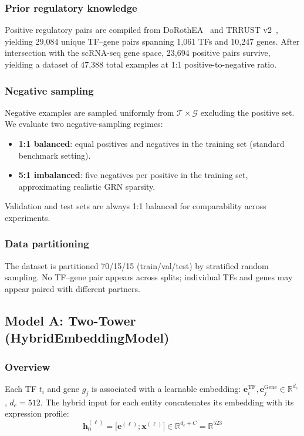 \documentclass[10pt,twocolumn]{article}
\begin{document}
\subsubsection{Prior regulatory knowledge}
Positive regulatory pairs are compiled from DoRothEA~\cite{garcia2019benchmark}
and TRRUST v2~\cite{han2018trrust}, yielding 29{,}084 unique TF--gene pairs
spanning 1{,}061 TFs and 10{,}247 genes.
After intersection with the scRNA-seq gene space, 23{,}694 positive pairs
survive, yielding a dataset of 47{,}388 total examples at 1:1 positive-to-negative ratio.

\subsubsection{Negative sampling}
\label{sec:negative}
Negative examples are sampled uniformly from $\mathcal{T} \times \mathcal{G}$
excluding the positive set.
We evaluate two negative-sampling regimes:
\begin{itemize}
    \item \textbf{1:1 balanced}: equal positives and negatives in the training
    set (standard benchmark setting).
    \item \textbf{5:1 imbalanced}: five negatives per positive in the training
    set, approximating realistic GRN sparsity.
\end{itemize}
Validation and test sets are always 1:1 balanced for comparability across
experiments.

\subsubsection{Data partitioning}
The dataset is partitioned 70/15/15 (train/val/test) by stratified random
sampling.
No TF--gene pair appears across splits; individual TFs and genes may appear
paired with different partners.

\subsection{Model A: Two-Tower (HybridEmbeddingModel)}
\label{sec:architecture}

\subsubsection{Overview}
Each TF $t_i$ and gene $g_j$ is associated with a learnable embedding:
$\mathbf{e}^{\text{TF}}_i, \mathbf{e}^{\text{Gene}}_j \in \mathbb{R}^{d_e}$,
$d_e = 512$.
The hybrid input for each entity concatenates its embedding with its expression
profile:
\begin{equation}
    \mathbf{h}_0^{(\ell)} = \bigl[\mathbf{e}^{(\ell)} \mathbin{;} \mathbf{x}^{(\ell)}\bigr]
    \in \mathbb{R}^{d_e + C} = \mathbb{R}^{523}
\end{equation}
\end{document}
